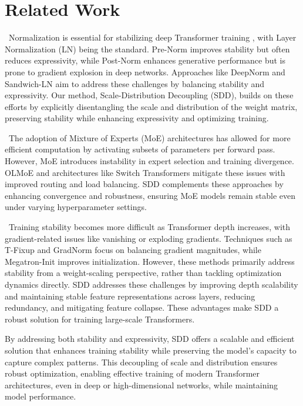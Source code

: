 \section{Related Work}
\label{sec:related work}
\textbf{}\
Normalization is essential for stabilizing deep Transformer training \citep{wang2024world, wang2022anchor}, with Layer Normalization (LN) \citep{ba2016layer,wang2022anchor} being the standard. Pre-Norm \citep{xiong2020layer} improves stability but often reduces expressivity, while Post-Norm \citep{vaswani2017attention} enhances generative performance but is prone to gradient explosion in deep networks. Approaches like DeepNorm \citep{wang2024deepnet} and Sandwich-LN \citep{ding2021cogview} aim to address these challenges by balancing stability and expressivity. Our method, Scale-Distribution Decoupling (SDD), builds on these efforts by explicitly disentangling the scale and distribution of the weight matrix, preserving stability while enhancing expressivity and optimizing training.

\textbf{}\
The adoption of Mixture of Experts (MoE) architectures \citep{shazeer2017outrageously,fedus2022switch} has allowed for more efficient computation by activating subsets of parameters per forward pass. However, MoE introduces instability in expert selection and training divergence. OLMoE \citep{muennighoff2024olmoeopenmixtureofexpertslanguage} and architectures like Switch Transformers \citep{fedus2022switch} mitigate these issues with improved routing and load balancing. SDD complements these approaches by enhancing convergence and robustness, ensuring MoE models remain stable even under varying hyperparameter settings.

\textbf{\noindent{Scaling and Stability in Large Language Models.}}\
Training stability becomes more difficult as Transformer depth increases, with gradient-related issues like vanishing or exploding gradients. Techniques such as T-Fixup \citep{huang2020improving} and GradNorm \citep{chen2018gradnorm} focus on balancing gradient magnitudes, while Megatron-Init \citep{shoeybi2019megatron} improves initialization. However, these methods primarily address stability from a weight-scaling perspective, rather than tackling optimization dynamics directly. SDD addresses these challenges by improving depth scalability and maintaining stable feature representations across layers, reducing redundancy, and mitigating feature collapse. These advantages make SDD a robust solution for training large-scale Transformers.

By addressing both stability and expressivity, SDD offers a scalable and efficient solution that enhances training stability while preserving the model's capacity to capture complex patterns. This decoupling of scale and distribution ensures robust optimization, enabling effective training of modern Transformer architectures, even in deep or high-dimensional networks, while maintaining model performance.